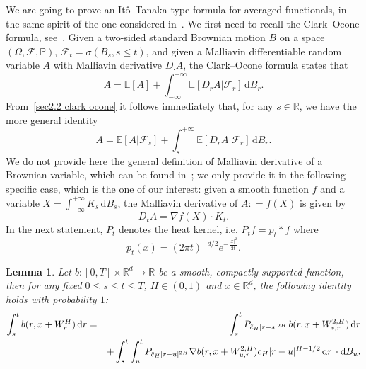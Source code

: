 \documentclass[10pt]{article}
\newcommand{\mathd}{\mathrm{d}}
\newcommand{\nobracket}{}
\newcommand{\tmcolor}[2]{{\color{#1}{#2}}}
\newtheorem{lemma}{Lemma}
\begin{document}
We are going to prove an It\^o--Tanaka type formula for averaged functionals,
in the same spirit of the one considered in~{\cite{coutin}}. We first need to
recall the Clark--Ocone formula, see~{\cite{nualart2006}}. Given a
two\mbox{-}sided standard Brownian motion $B$ on a space $(\Omega,
\mathcal{F}, \mathbb{P})$, $\mathcal{F}_t = \sigma (B_s, s \leqslant t)$, and
given a Malliavin differentiable random variable $A$ with Malliavin derivative
$D_{\cdot} A$, the Clark--Ocone formula states that
\begin{equation}
  A =\mathbb{E} [A] + \int_{- \infty}^{+ \infty} \mathbb{E} [D_r A |
  \mathcal{F}_r \nobracket] \, \mathd B_r . \label{sec2.2 clark ocone}
\end{equation}
From~{\eqref{sec2.2 clark ocone}} it follows immediately that, for any $s \in
\mathbb{R}$, we have the more general identity
\[ A =\mathbb{E} [A | \mathcal{F}_s \nobracket] + \int_s^{+ \infty} \mathbb{E}
   [D_r A | \mathcal{F}_r \nobracket] \, \mathd B_r . \]
We do not provide here the general definition of Malliavin derivative of a
Brownian variable, which can be found in~{\cite{nualart2006}}; we only provide
it in the following specific case, which is the one of our interest: given a
smooth function $f$ and a variable $X = \int_{- \infty}^{+ \infty} K_s \,
\mathd B_s$, the Malliavin derivative of $A : = f (X)$ is given by
\begin{equation}
  D_t A = \nabla f (X) \cdot K_t . \label{sec2.2 malliavin derivative}
\end{equation}
In the next statement, $P_t$ denotes the heat kernel, i.e. $P_t f = p_t \ast
f$ where
\[
p_t (x) = (2 \pi t)^{- d / 2} e^{- \frac{| x |^2}{2 t}} .
\]
\begin{lemma}
  \label{sec3.2 lemma ito tanaka}Let $b : [0, T] \times \mathbb{R}^d
  \rightarrow \mathbb{R}$ be a smooth, compactly supported function, then for
  any fixed $0 \leqslant s \leqslant t \leqslant T$, $H \in (0, 1)$ and $x \in
  \mathbb{R}^d$, the following identity holds with probability $1$:
  \begin{eqnarray}
    \int_s^t b (r, x + W^H_r) \, \mathd r & = & \tmcolor{black}{\int_s^t
    P_{\tilde{c}_H | r - s |^{2 H}} \, b (r, x + W^{2, H}_{s, r}) \, \mathd r}
    \label{sec3.2 preliminary ito tanaka} \\
    &  & + \int_s^t \int_u^t P_{\tilde{c}_H | r - u |^{2 H}} \nabla b (r, x +
    W^{2, H}_{u, r}) c_H | r - u |^{H - 1 / 2} \, \mathd r \, \cdot \mathd B_u
    . \nonumber
  \end{eqnarray}
\end{lemma}
\end{document}
